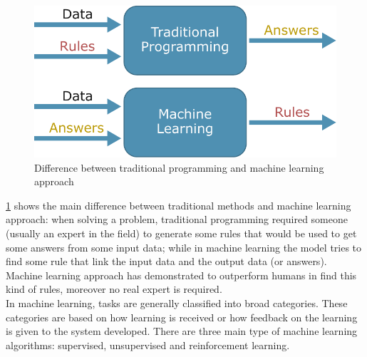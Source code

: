 \begin{figure}[H]
\centering
    \includegraphics[width=.45\linewidth]{images/Background/ML/MLvstrad.pdf}
\caption[Traditional and machine learning approaches]{Difference between traditional programming and machine learning approach}
\label{fig:tradvsml}
\end{figure}

\noindent \ref{fig:tradvsml} shows the main difference between traditional methods and machine learning approach: when solving a problem, traditional programming required someone (usually an expert in the field) to generate some rules that would be used to get some answers from some input data; while in machine learning the model tries to find some rule that link the input data and the output data (or answers). Machine learning approach has demonstrated to outperform humans in find this kind of rules, moreover no real expert is required. \\

In machine learning, tasks are generally classified into broad categories. These categories are based on how learning is received or how feedback on the learning is given to the system developed.
There are three main type of machine learning algorithms: supervised, unsupervised and reinforcement learning.

